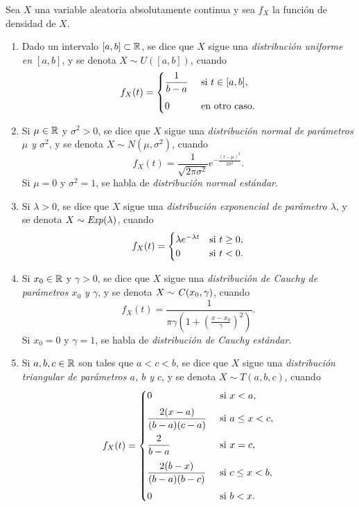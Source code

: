 \documentclass[a4paper, 11pt, extrafontsizes]{memoir}
\begin{document}
\begin{definition}
    Sea $X$ una variable aleatoria absolutamente continua y sea $f_X$ la función de densidad de $X$.
    \begin{enumerate}
        \item Dado un intervalo $[a,b] \subset \mathbb R$, se dice que $X$ sigue una \emph{{distribución uniforme en $[a,b]$}}, y se denota $X \sim U([a,b])$, cuando
        \[f_X(t)=\begin{cases}
            \displaystyle{\frac{1}{b-a}} & $ si $ t \in [a,b],\\[10pt]
            0 & $ en otro caso$.
        \end{cases}\]
        \item Si $\mu \in \mathbb R$ y $\sigma^2 > 0$, se dice que $X$ sigue una \emph{{distribución normal de parámetros ${\mu}$ y ${\sigma^2}$}}, y se denota $X \sim N(\mu,\sigma^2)$, cuando
        \[f_X(t) = \frac{1}{\sqrt{2\pi\sigma^2}}e^{-\frac{(t-\mu)^2}{2\sigma^2}}.\]
        Si $\mu=0$ y $\sigma^2=1$, se habla de \emph{{distribución normal estándar}}.
        \item Si $\lambda > 0$, se dice que $X$ sigue una \emph{{distribución exponencial de parámetro ${\lambda}$}}, y se denota $X \sim \textup{\emph{Exp}}(\lambda)$, cuando
        \[f_X(t) = \begin{cases}
            \lambda e^{-\lambda t} & $si$ \ t \geq 0, \\
            0 & $si$ \ t < 0.
        \end{cases}\]
        \item Si $x_0 \in \mathbb R$ y $\gamma > 0$, se dice que $X$ sigue una \emph{distribución de Cauchy de parámetros $x_0$ y $\gamma$}, y se denota $X \sim \textup{\emph{C}}(x_0,\gamma)$, cuando
        \[f_X(t) = \frac{1}{\pi \gamma (1+(\frac{x-x_0}{\gamma})^2)}.\]
        Si $x_0 = 0$ y $\gamma = 1$, se habla de \emph{distribución de Cauchy estándar}.
        \item Si $a,b,c \in \mathbb R$ son tales que $a < c < b$, se dice que $X$ sigue una \emph{distribución triangular de parámetros $a$, $b$ y $c$}, y se denota $X \sim T(a,b,c)$, cuando
        \[f_X(t) = \begin{cases}
            0 & $ si $ x < a, \\[5pt]
            \displaystyle \frac{2(x-a)}{(b-a)(c-a)} & $ si $ a \leq x < c, \\[10pt]
            \displaystyle \frac{2}{b-a} & $ si $ x = c, \\[10pt]
            \displaystyle \frac{2(b-x)}{(b-a)(b-c)} & $ si $ c \leq x < b, \\[10pt]
            0 & $ si $ b < x.
        \end{cases}\]
    \end{enumerate}
\end{definition}
\end{document}
